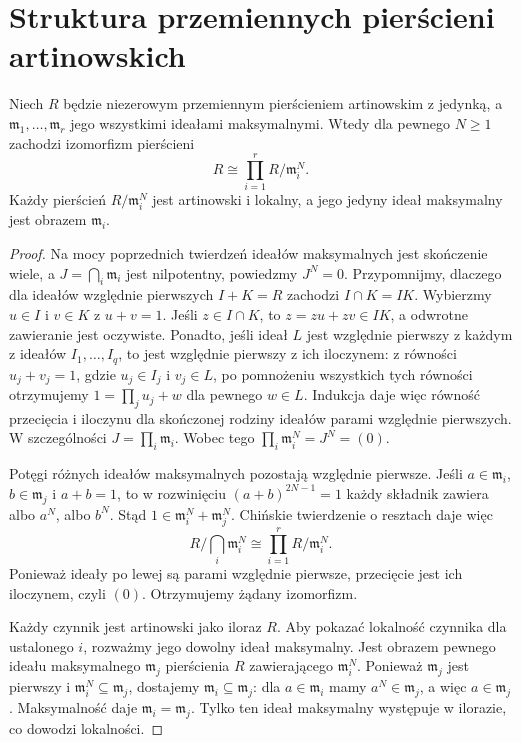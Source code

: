 \section{Struktura przemiennych pierścieni artinowskich}
\begin{twierdzenie}
\label{aa:tw:artin-local-product}
Niech $R$ będzie niezerowym przemiennym pierścieniem
artinowskim z jedynką, a
$\mathfrak m_1,\ldots,\mathfrak m_r$ jego wszystkimi
ideałami maksymalnymi. Wtedy dla pewnego $N\ge1$
zachodzi izomorfizm pierścieni
\[
 R\cong\prod_{i=1}^r R/\mathfrak m_i^N.
\]
Każdy pierścień $R/\mathfrak m_i^N$ jest artinowski
i lokalny, a jego jedyny ideał maksymalny jest obrazem
$\mathfrak m_i$.
\end{twierdzenie}
\begin{proof}
Na mocy poprzednich twierdzeń ideałów maksymalnych
jest skończenie wiele, a $J=\bigcap_i\mathfrak m_i$
jest nilpotentny, powiedzmy $J^N=0$.
Przypomnijmy, dlaczego dla ideałów względnie pierwszych
$I+K=R$ zachodzi $I\cap K=IK$. Wybierzmy $u\in I$
i $v\in K$ z $u+v=1$. Jeśli $z\in I\cap K$, to
$z=zu+zv\in IK$, a odwrotne zawieranie jest oczywiste.
Ponadto, jeśli ideał $L$ jest względnie pierwszy z każdym
z ideałów $I_1,\ldots,I_q$, to jest względnie pierwszy
z ich iloczynem: z równości $u_j+v_j=1$, gdzie
$u_j\in I_j$ i $v_j\in L$, po pomnożeniu wszystkich
tych równości otrzymujemy
$1=\prod_j u_j+w$ dla pewnego $w\in L$.
Indukcja daje więc równość przecięcia i iloczynu
dla skończonej rodziny ideałów parami względnie pierwszych.
W szczególności $J=\prod_i\mathfrak m_i$.
Wobec tego
$\prod_i\mathfrak m_i^N=J^N=(0)$.

Potęgi różnych ideałów maksymalnych pozostają
względnie pierwsze. Jeśli $a\in\mathfrak m_i$,
$b\in\mathfrak m_j$ i $a+b=1$, to w rozwinięciu
$(a+b)^{2N-1}=1$ każdy składnik zawiera albo
$a^N$, albo $b^N$. Stąd
$1\in\mathfrak m_i^N+\mathfrak m_j^N$.
Chińskie twierdzenie o resztach daje więc
\[
 R/\bigcap_i\mathfrak m_i^N
 \cong\prod_{i=1}^r R/\mathfrak m_i^N.
\]
Ponieważ ideały po lewej są parami względnie pierwsze,
przecięcie jest ich iloczynem, czyli $(0)$.
Otrzymujemy żądany izomorfizm.

Każdy czynnik jest artinowski jako iloraz $R$.
Aby pokazać lokalność czynnika dla ustalonego $i$,
rozważmy jego dowolny ideał maksymalny. Jest obrazem
pewnego ideału maksymalnego $\mathfrak m_j$ pierścienia
$R$ zawierającego $\mathfrak m_i^N$.
Ponieważ $\mathfrak m_j$ jest pierwszy i
$\mathfrak m_i^N\subseteq\mathfrak m_j$, dostajemy
$\mathfrak m_i\subseteq\mathfrak m_j$:
dla $a\in\mathfrak m_i$ mamy $a^N\in\mathfrak m_j$,
a więc $a\in\mathfrak m_j$. Maksymalność daje
$\mathfrak m_i=\mathfrak m_j$.
Tylko ten ideał maksymalny występuje w ilorazie,
co dowodzi lokalności.
\end{proof}

